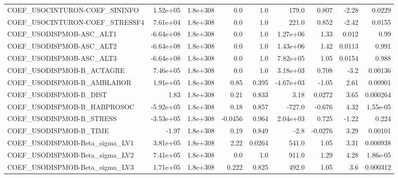 \begin{tabular}{lrrrrrrrr}
COEF\_USOCINTURON-COEF\_SININFO     &    1.52e+05 &     1.8e+308 &     0.0 &      1.0 &      179.0 &       0.807 &        -2.28 &        0.0229 \\
COEF\_USOCINTURON-COEF\_STRESSF4    &    7.61e+04 &     1.8e+308 &     0.0 &      1.0 &      221.0 &       0.852 &        -2.42 &        0.0155 \\
COEF\_USODISPMOB-ASC\_ALT1          &   -6.64e+08 &     1.8e+308 &     0.0 &      1.0 &   1.27e+06 &        1.33 &        0.012 &          0.99 \\
COEF\_USODISPMOB-ASC\_ALT2          &   -6.64e+08 &     1.8e+308 &     0.0 &      1.0 &   1.43e+06 &        1.42 &       0.0113 &         0.991 \\
COEF\_USODISPMOB-ASC\_ALT3          &   -6.64e+08 &     1.8e+308 &     0.0 &      1.0 &   7.82e+05 &        1.05 &       0.0154 &         0.988 \\
COEF\_USODISPMOB-B\_ACTAGRE         &    7.46e+05 &     1.8e+308 &     0.0 &      1.0 &   3.18e+03 &       0.708 &         -3.2 &       0.00136 \\
COEF\_USODISPMOB-B\_AMBLABOR        &    1.91e+05 &     1.8e+308 &    0.85 &    0.395 &  -4.67e+03 &       -1.05 &         2.61 &       0.00901 \\
COEF\_USODISPMOB-B\_DIST            &        1.83 &     1.8e+308 &    0.21 &    0.833 &       3.18 &      0.0272 &         3.65 &      0.000264 \\
COEF\_USODISPMOB-B\_HABPROSOC       &   -5.92e+05 &     1.8e+308 &    0.18 &    0.857 &     -727.0 &      -0.676 &         4.32 &      1.55e-05 \\
COEF\_USODISPMOB-B\_STRESS          &   -3.53e+05 &     1.8e+308 & -0.0456 &    0.964 &   2.04e+03 &       0.725 &        -1.22 &         0.224 \\
COEF\_USODISPMOB-B\_TIME            &       -1.97 &     1.8e+308 &    0.19 &    0.849 &       -2.8 &     -0.0276 &         3.29 &       0.00101 \\
COEF\_USODISPMOB-Beta\_sigma\_LV1    &    3.81e+05 &     1.8e+308 &    2.22 &   0.0264 &      541.0 &        1.05 &         3.31 &      0.000938 \\
COEF\_USODISPMOB-Beta\_sigma\_LV2    &    7.41e+05 &     1.8e+308 &     0.0 &      1.0 &      911.0 &        1.29 &         4.28 &      1.86e-05 \\
COEF\_USODISPMOB-Beta\_sigma\_LV3    &    1.71e+05 &     1.8e+308 &   0.222 &    0.825 &      492.0 &        1.05 &          3.6 &      0.000312 \\

\end{tabular}
